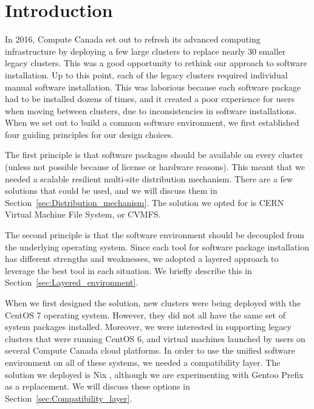\documentclass[sigconf]{acmart}
\begin{document}
%
\maketitle

\section{Introduction}
\label{sec:Introduction}
In 2016, Compute Canada set out to refresh its advanced computing infrastructure by deploying a few large clusters to replace nearly 30 smaller legacy clusters. This was a good opportunity to rethink our approach to software installation. Up to this point, each of the legacy clusters required individual manual software installation. This was laborious because each software package had to be installed dozens of times, and it created a poor experience for users when moving between clusters, due to inconsistencies in software installations. When we set out to build a common software environment, we first established four guiding principles for our design choices.

The first principle is that software packages should be available on every cluster (unless not possible because of license or hardware reasons). This meant that we needed a scalable resilient multi-site distribution mechanism. There are a few solutions that could be used, and we will discuss them in Section~\ref{sec:Distribution_mechanism}. The solution we opted for is CERN Virtual Machine File System, or CVMFS\cite{CVMFS}.

The second principle is that the software environment should be decoupled from the underlying operating system. Since each tool for software package installation has different strengths and weaknesses, we adopted a layered approach to leverage the best tool in each situation. We briefly describe this in Section~\ref{sec:Layered_environment}.

When we first designed the solution, new clusters were being deployed with the CentOS 7 operating system. However, they did not all have the same set of system packages installed. Moreover, we were interested in supporting legacy clusters
that were running CentOS 6, and virtual machines launched by users on several Compute Canada cloud platforms. In order to use the unified software environment on all of these systems, we needed a compatibility layer. 
The solution we deployed is Nix \cite{Nix}, although we are experimenting with Gentoo Prefix \cite{Gentoo} as a replacement. We will discuss these options in Section~\ref{sec:Compatibility_layer}.
\end{document}
